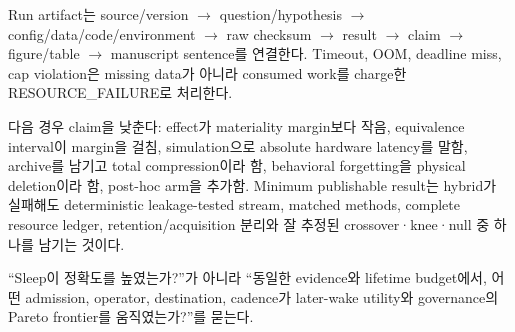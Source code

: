 Run artifact는 source/version $\rightarrow$ question/hypothesis $\rightarrow$ config/data/code/environment
$\rightarrow$ raw checksum $\rightarrow$ result $\rightarrow$ claim $\rightarrow$ figure/table
$\rightarrow$ manuscript sentence를 연결한다. Timeout, OOM, deadline miss, cap violation은 missing data가
아니라 consumed work를 charge한 RESOURCE\_FAILURE로 처리한다.

다음 경우 claim을 낮춘다: effect가 materiality margin보다 작음, equivalence interval이 margin을 걸침,
simulation으로 absolute hardware latency를 말함, archive를 남기고 total compression이라 함, behavioral
forgetting을 physical deletion이라 함, post-hoc arm을 추가함. Minimum publishable result는 hybrid가
실패해도 deterministic leakage-tested stream, matched methods, complete resource ledger, retention/acquisition
분리와 잘 추정된 crossover·knee·null 중 하나를 남기는 것이다.

\begin{keypoint}[실험의 최종 질문]
``Sleep이 정확도를 높였는가?''가 아니라 ``동일한 evidence와 lifetime budget에서, 어떤 admission,
operator, destination, cadence가 later-wake utility와 governance의 Pareto frontier를 움직였는가?''를 묻는다.
\end{keypoint}
